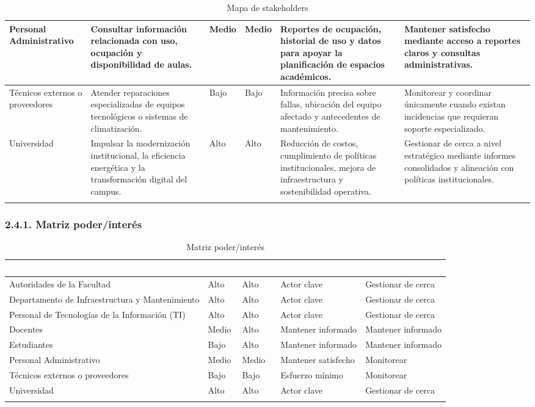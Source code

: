 \begin{longtable}{|p{2.6cm}|p{2.6cm}|p{2.6cm}|p{2.6cm}|p{2.6cm}|p{2.6cm}|}
Personal Administrativo & Consultar información relacionada con uso, ocupación y disponibilidad de aulas. & Medio & Medio & Reportes de ocupación, historial de uso y datos para apoyar la planificación de espacios académicos. & Mantener satisfecho mediante acceso a reportes claros y consultas administrativas. \\ \hline
Técnicos externos o proveedores & Atender reparaciones especializadas de equipos tecnológicos o sistemas de climatización. & Bajo & Bajo & Información precisa sobre fallas, ubicación del equipo afectado y antecedentes de mantenimiento. & Monitorear y coordinar únicamente cuando existan incidencias que requieran soporte especializado. \\ \hline
Universidad & Impulsar la modernización institucional, la eficiencia energética y la transformación digital del campus. & Alto & Alto & Reducción de costos, cumplimiento de políticas institucionales, mejora de infraestructura y sostenibilidad operativa. & Gestionar de cerca a nivel estratégico mediante informes consolidados y alineación con políticas institucionales. \\ \hline
\caption{Mapa de stakeholders}
\end{longtable}
\endgroup

\subsubsection*{2.4.1. Matriz poder/interés}


\begingroup
\small
\begin{longtable}{|p{3.1cm}|p{3.1cm}|p{3.1cm}|p{3.1cm}|p{3.1cm}|}
\hline
\cellcolor{sigagreen}\textcolor{white}{\textbf{Stakeholder}} & \cellcolor{sigagreen}\textcolor{white}{\textbf{Poder}} & \cellcolor{sigagreen}\textcolor{white}{\textbf{Interés}} & \cellcolor{sigagreen}\textcolor{white}{\textbf{Clasificación}} & \cellcolor{sigagreen}\textcolor{white}{\textbf{Estrategia}} \\ \hline
Autoridades de la Facultad & Alto & Alto & Actor clave & Gestionar de cerca \\ \hline
Departamento de Infraestructura y Mantenimiento & Alto & Alto & Actor clave & Gestionar de cerca \\ \hline
Personal de Tecnologías de la Información (TI) & Alto & Alto & Actor clave & Gestionar de cerca \\ \hline
Docentes & Medio & Alto & Mantener informado & Mantener informado \\ \hline
Estudiantes & Bajo & Alto & Mantener informado & Mantener informado \\ \hline
Personal Administrativo & Medio & Medio & Mantener satisfecho & Monitorear \\ \hline
Técnicos externos o proveedores & Bajo & Bajo & Esfuerzo mínimo & Monitorear \\ \hline
Universidad & Alto & Alto & Actor clave & Gestionar de cerca \\ \hline
\caption{Matriz poder/interés}
\end{longtable}
\endgroup

